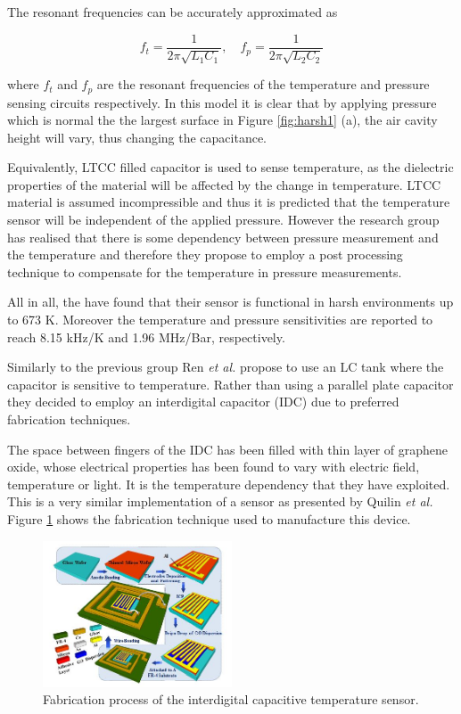 \documentclass[11pt,a4paper]{article}
\begin{document}
The resonant frequencies can be accurately approximated as

\begin{equation}
f_t = \frac{1}{2\pi \sqrt{L_1C_1}}, \quad f_p = \frac{1}{2\pi \sqrt{L_2C_2}}
\end{equation}

where $f_t$ and $f_p$ are the resonant frequencies of the temperature and pressure sensing circuits respectively. In this model it is clear that by applying pressure which is normal the the largest surface in Figure \ref{fig:harsh1} (a), the air cavity height will vary, thus changing the capacitance.

Equivalently, LTCC filled capacitor is used to sense temperature, as the dielectric properties of the material will be affected by the change in temperature. LTCC material is assumed incompressible and thus it is predicted that the temperature sensor will be independent of the applied pressure. However the research group has realised that there is some dependency between pressure measurement and the temperature and therefore they propose to employ a post processing technique to compensate for the temperature in pressure measurements.

All in all, the have found that their sensor is functional in harsh environments up to 673 K. Moreover the temperature and pressure sensitivities are reported to reach 8.15 kHz/K and 1.96 MHz/Bar, respectively.

Similarly to the previous group Ren \textit{et al.} \cite{graphene} propose to use an LC tank where the capacitor is sensitive to temperature. Rather than using a parallel plate capacitor they decided to employ an interdigital capacitor (IDC) due to preferred fabrication techniques.

The space between fingers of the IDC has been filled with thin layer of graphene oxide, whose electrical properties has been found to vary with electric field, temperature or light. It is the temperature dependency that they have exploited. This is a very similar implementation of a sensor as presented by Quilin \textit{et al.} Figure \ref{fig:IDC} shows the fabrication technique used to manufacture this device.

\begin{figure}[h]
\centering
\includegraphics[width=0.5\textwidth]{graphene1.JPG}
\caption{Fabrication process of the interdigital capacitive temperature sensor. \cite{graphene}\label{fig:IDC}}
\end{figure}
\end{document}
